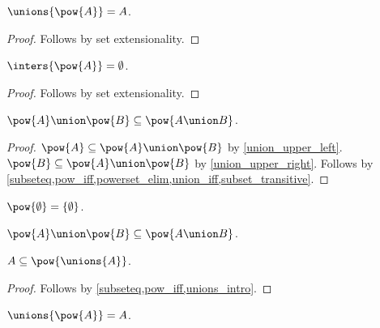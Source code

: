 \begin{proposition}\label{unions_powerset}
    $\unions{\pow{A}} = A$.
\end{proposition}
\begin{proof}
    Follows by set extensionality.
\end{proof}

\begin{proposition}\label{inters_powerset}
    $\inters{\pow{A}} = \emptyset$.
\end{proposition}
\begin{proof}
    Follows by set extensionality.
\end{proof}

\begin{proposition}\label{union_powersets_subseteq}
    $\pow{A}\union\pow{B} \subseteq \pow{A\union B}$.
\end{proposition}
\begin{proof}
    $\pow{A}\subseteq \pow{A}\union\pow{B}$ by \cref{union_upper_left}.
    $\pow{B}\subseteq \pow{A}\union\pow{B}$ by \cref{union_upper_right}.
    Follows by \cref{subseteq,pow_iff,powerset_elim,union_iff,subset_transitive}.
\end{proof}

\begin{proposition}\label{powerset_emptyset}
    $\pow{\emptyset} = \{\emptyset\}$.
\end{proposition}


\begin{proposition}\label{powerset_union_subseteq}
    $\pow{A}\union\pow{B}\subseteq \pow{A\union B}$.
\end{proposition}

\begin{proposition}\label{subseteq_pow_unions}
    $A\subseteq\pow{\unions{A}}$.
\end{proposition}
\begin{proof}
    Follows by \cref{subseteq,pow_iff,unions_intro}.
\end{proof}

\begin{proposition}\label{unions_pow}
    $\unions{\pow{A}} = A$.
\end{proposition}


